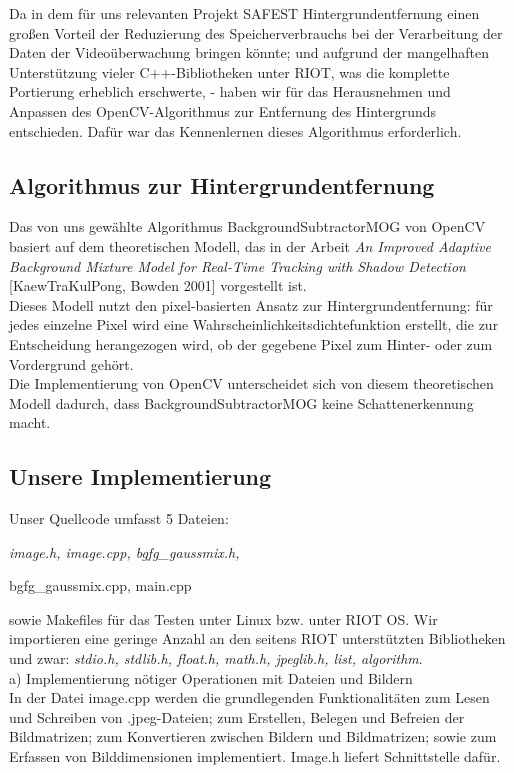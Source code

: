 \documentclass[10pt,a4paper]{article}
\begin{document}
Da in dem für uns relevanten Projekt SAFEST Hintergrundentfernung einen großen Vorteil der Reduzierung des Speicherverbrauchs bei der Verarbeitung der Daten der Videoüberwachung bringen könnte; und aufgrund der mangelhaften Unterstützung vieler C++-Bibliotheken unter RIOT, was die komplette Portierung erheblich erschwerte, - haben wir für das Herausnehmen und Anpassen des OpenCV-Algorithmus zur Entfernung des Hintergrunds entschieden. Dafür war das Kennenlernen dieses Algorithmus erforderlich. 

\subsection{Algorithmus zur Hintergrundentfernung}

Das von uns gewählte Algorithmus BackgroundSubtractorMOG von OpenCV basiert auf dem theoretischen Modell, das in der Arbeit {\it An Improved Adaptive Background Mixture Model for Real-Time Tracking with Shadow Detection} [KaewTraKulPong, Bowden 2001] vorgestellt ist. \\

Dieses Modell nutzt den pixel-basierten Ansatz zur Hintergrundentfernung: für jedes einzelne Pixel wird eine Wahrscheinlichkeitsdichtefunktion erstellt, die zur Entscheidung herangezogen wird, ob der gegebene Pixel zum Hinter- oder zum Vordergrund gehört. \\

Die Implementierung von OpenCV unterscheidet sich von diesem theoretischen Modell dadurch, dass BackgroundSubtractorMOG keine Schattenerkennung macht. 

\subsection{Unsere Implementierung}

Unser Quellcode umfasst 5 Dateien: {\it image.h, image.cpp, bgfg\_gaussmix.h,

 bgfg\_gaussmix.cpp, main.cpp} sowie Makefiles für das Testen unter Linux bzw. unter RIOT OS. Wir importieren eine geringe Anzahl an den seitens RIOT unterstützten Bibliotheken und zwar: {\it stdio.h, stdlib.h, float.h, math.h, jpeglib.h, list, algorithm}. \\

a) Implementierung nötiger Operationen mit Dateien und Bildern \\

In der Datei image.cpp werden die grundlegenden Funktionalitäten zum Lesen und Schreiben von .jpeg-Dateien; zum Erstellen, Belegen und Befreien der Bildmatrizen; zum Konvertieren zwischen Bildern und Bildmatrizen; sowie zum Erfassen von Bilddimensionen implementiert. Image.h liefert Schnittstelle dafür.
\end{document}
